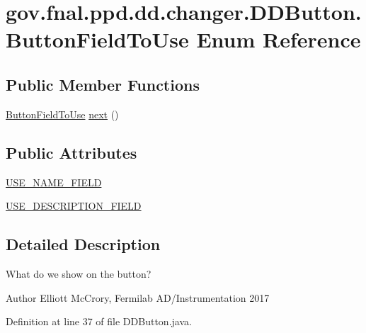 \hypertarget{enumgov_1_1fnal_1_1ppd_1_1dd_1_1changer_1_1DDButton_1_1ButtonFieldToUse}{\section{gov.\-fnal.\-ppd.\-dd.\-changer.\-D\-D\-Button.\-Button\-Field\-To\-Use Enum Reference}
\label{enumgov_1_1fnal_1_1ppd_1_1dd_1_1changer_1_1DDButton_1_1ButtonFieldToUse}
}
\subsection*{Public Member Functions}
\begin{DoxyCompactItemize}
\item 
\hyperlink{enumgov_1_1fnal_1_1ppd_1_1dd_1_1changer_1_1DDButton_1_1ButtonFieldToUse}{Button\-Field\-To\-Use} \hyperlink{enumgov_1_1fnal_1_1ppd_1_1dd_1_1changer_1_1DDButton_1_1ButtonFieldToUse_af2ef4fcf39c333af8e9bc670a7c19840}{next} ()
\end{DoxyCompactItemize}
\subsection*{Public Attributes}
\begin{DoxyCompactItemize}
\item 
\hyperlink{enumgov_1_1fnal_1_1ppd_1_1dd_1_1changer_1_1DDButton_1_1ButtonFieldToUse_a68754ca17fd3e4649184763d72308b13}{U\-S\-E\-\_\-\-N\-A\-M\-E\-\_\-\-F\-I\-E\-L\-D}
\item 
\hyperlink{enumgov_1_1fnal_1_1ppd_1_1dd_1_1changer_1_1DDButton_1_1ButtonFieldToUse_a49d0f646fba74578ef1a73a09c0c943b}{U\-S\-E\-\_\-\-D\-E\-S\-C\-R\-I\-P\-T\-I\-O\-N\-\_\-\-F\-I\-E\-L\-D}
\end{DoxyCompactItemize}


\subsection{Detailed Description}
What do we show on the button?

\begin{DoxyAuthor}{Author}
Elliott Mc\-Crory, Fermilab A\-D/\-Instrumentation 2017 
\end{DoxyAuthor}


Definition at line 37 of file D\-D\-Button.\-java.



